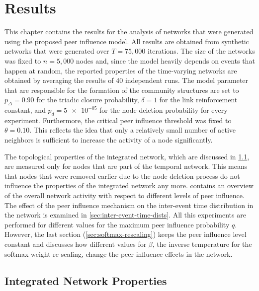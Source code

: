 \chapter{Results}
\label{cha:results}


This chapter contains the results for the analysis of networks that were generated using the proposed peer influence model.
All results are obtained from synthetic networks that were generated over \( T = 75,000 \) iterations.
The size of the networks was fixed to \(n = 5,000 \) nodes and, since the model heavily depends on events that happen at random, the reported properties of the time-varying networks are obtained by averaging the results of 40 independent runs.
The model parameter that are responsible for the formation of the community structures are set to \( p_{\Delta} = 0.90 \) for the triadic closure probability, \( \delta = 1 \) for the link reinforcement constant, and \( p_{d} = \num{5e-05} \) for the node deletion probability for every experiment.
Furthermore, the critical peer influence threshold was fixed to \( \theta = 0.10 \).
This reflects the idea that only a relatively small number of active neighbors is sufficient to increase the activity of a node significantly.

The topological properties of the integrated network, which are discussed in \cref{sec:integrated-network-properties}, are measured only for nodes that are part of the temporal network.
This means that nodes that were removed earlier due to the node deletion process do not influence the properties of the integrated network any more.
 contains an overview of the overall network activity with respect to different levels of peer influence.
The effect of the peer influence mechanism on the inter-event time distribution in the network is examined in \cref{sec:inter-event-time-dists}.
All this experiments are performed for different values for the maximum peer influence probability \( q \).
However, the last section (\cref{sec:softmax-rescaling}) keeps the peer influence level constant and discusses how different values for \( \beta \), the inverse temperature for the softmax weight re-scaling, change the peer influence effects in the network.




\section{Integrated Network Properties}
\label{sec:integrated-network-properties}


